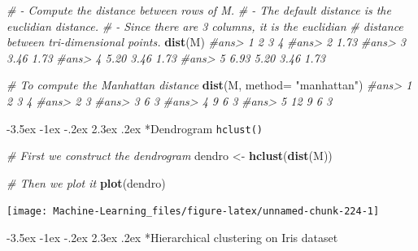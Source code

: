 \documentclass[]{book}
\makeatletter
\newenvironment{Shaded}{\begin{snugshade}}{\end{snugshade}}
\newcommand{\KeywordTok}[1]{\textcolor[rgb]{0.13,0.29,0.53}{\textbf{#1}}}
\newcommand{\DataTypeTok}[1]{\textcolor[rgb]{0.13,0.29,0.53}{#1}}
\newcommand{\StringTok}[1]{\textcolor[rgb]{0.31,0.60,0.02}{#1}}
\newcommand{\CommentTok}[1]{\textcolor[rgb]{0.56,0.35,0.01}{\textit{#1}}}
\newcommand{\NormalTok}[1]{#1}
\renewcommand\section{\@startsection {section}{1}{\z@}%
                                   {-3.5ex \@plus -1ex \@minus -.2ex}%
                                   {2.3ex \@plus.2ex}%
                                   {\normalfont\Large\bfseries\color{ForestGreen}}}
\theoremstyle{definition}
\theoremstyle{definition}
\theoremstyle{definition}
\theoremstyle{remark}
\makeatother
\begin{document}
\begin{Shaded}
\begin{Highlighting}[]
\CommentTok{# - Compute the distance between rows of M.}
\CommentTok{# - The default distance is the euclidian distance.}
\CommentTok{# - Since there are 3 columns, it is the euclidian}
\CommentTok{#        distance between tri-dimensional points.}
\KeywordTok{dist}\NormalTok{(M)}
\CommentTok{#ans>      1    2    3    4}
\CommentTok{#ans> 2 1.73               }
\CommentTok{#ans> 3 3.46 1.73          }
\CommentTok{#ans> 4 5.20 3.46 1.73     }
\CommentTok{#ans> 5 6.93 5.20 3.46 1.73}
\end{Highlighting}
\end{Shaded}

\begin{Shaded}
\begin{Highlighting}[]
\CommentTok{# To compute the Manhattan distance }
\KeywordTok{dist}\NormalTok{(M, }\DataTypeTok{method=} \StringTok{"manhattan"}\NormalTok{)}
\CommentTok{#ans>    1  2  3  4}
\CommentTok{#ans> 2  3         }
\CommentTok{#ans> 3  6  3      }
\CommentTok{#ans> 4  9  6  3   }
\CommentTok{#ans> 5 12  9  6  3}
\end{Highlighting}
\end{Shaded}

\section*{\texorpdfstring{Dendrogram
\texttt{hclust()}}{Dendrogram hclust()}}\label{dendrogram-hclust}

\begin{Shaded}
\begin{Highlighting}[]
\CommentTok{# First we construct the dendrogram }
\NormalTok{dendro <-}\StringTok{ }\KeywordTok{hclust}\NormalTok{(}\KeywordTok{dist}\NormalTok{(M))}

\CommentTok{# Then we plot it}
\KeywordTok{plot}\NormalTok{(dendro)}
\end{Highlighting}
\end{Shaded}

\begin{center}\texttt{[image: Machine-Learning\_files/figure-latex/unnamed-chunk-224-1]} \end{center}

\section*{Hierarchical clustering on Iris
dataset}\label{hierarchical-clustering-on-iris-dataset}
\end{document}
